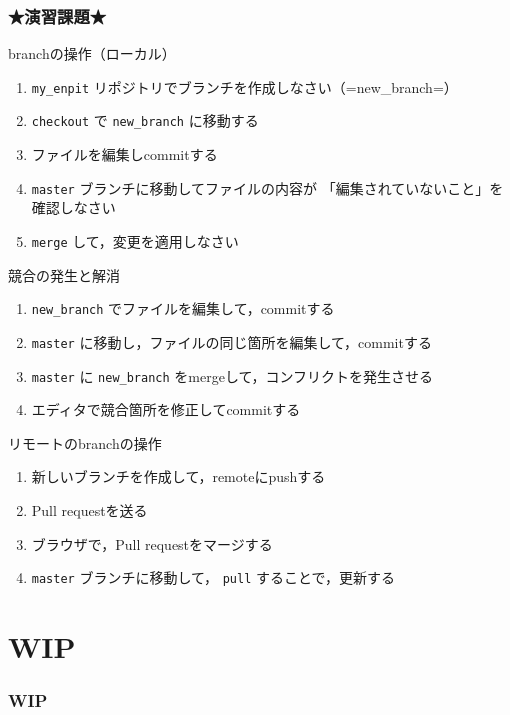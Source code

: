 \documentclass[t, aspectratio=169]{beamer}
\begin{document}
\section{★演習課題★}
\label{sec-3-3}
\begin{frame}[fragile,label=sec-3-3-1]{branchの操作（ローカル）}
 \begin{enumerate}
\item \texttt{my\_enpit} リポジトリでブランチを作成しなさい（=new\_branch=）
\item \texttt{checkout} で \texttt{new\_branch} に移動する
\item ファイルを編集しcommitする
\item \texttt{master} ブランチに移動してファイルの内容が
「編集されていないこと」を確認しなさい
\item \texttt{merge} して，変更を適用しなさい
\end{enumerate}
\end{frame}
\begin{frame}[fragile,label=sec-3-3-2]{競合の発生と解消}
 \begin{enumerate}
\item \texttt{new\_branch} でファイルを編集して，commitする
\item \texttt{master} に移動し，ファイルの同じ箇所を編集して，commitする
\item \texttt{master} に \texttt{new\_branch} をmergeして，コンフリクトを発生させる
\item エディタで競合箇所を修正してcommitする
\end{enumerate}
\end{frame}
\begin{frame}[fragile,label=sec-3-3-3]{リモートのbranchの操作}
 \begin{enumerate}
\item 新しいブランチを作成して，remoteにpushする
\item Pull requestを送る
\item ブラウザで，Pull requestをマージする
\item \texttt{master} ブランチに移動して， \texttt{pull} することで，更新する
\end{enumerate}
\end{frame}
\part{{\bfseries\sffamily WIP} }
\label{sec-4}
\section{{\bfseries\sffamily WIP} }
\label{sec-4-1}
\end{document}
